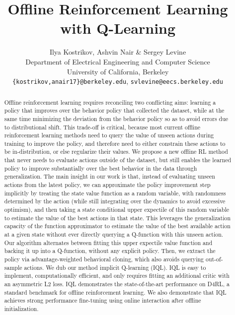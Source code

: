 \documentclass{article} %
\title{Offline Reinforcement Learning \\ with \Ournamepref Q-Learning}
\author{Ilya Kostrikov, Ashvin Nair \& Sergey Levine \\
Department of Electrical Engineering and Computer Science \\
University of California, Berkeley \\
\texttt{\{kostrikov,anair17\}@berkeley.edu}, \texttt{svlevine@eecs.berkeley.edu} 
}
\def\ourname{IQL\xspace}
\def\ournamepref{implicit\xspace}
\begin{document}
\maketitle

\begin{abstract}
Offline reinforcement learning requires reconciling two conflicting aims: learning a policy that improves over the behavior policy that collected the dataset, while at the same time minimizing the deviation from the behavior policy so as to avoid errors due to distributional shift. This trade-off is critical, because most current offline reinforcement learning methods need to query the value of unseen actions during training to improve the policy, and therefore need to either constrain these actions to be in-distribution, or else regularize their values. We propose a new offline RL method that never needs to evaluate actions outside of the dataset, but still enables the learned policy to improve substantially over the best behavior in the data through generalization.
The main insight in our work is that, instead of evaluating unseen actions from the latest policy, we can approximate the policy improvement step implicitly by treating the state value function as a random variable, with randomness determined by the action (while still integrating over the dynamics to avoid excessive optimism), and then taking a state conditional upper expectile of this random variable to estimate the value of the best actions in that state. This leverages the generalization capacity of the function approximator to estimate the value of the best available action at a given state without ever directly querying a Q-function with this unseen action.
Our algorithm alternates between fitting this upper expectile value function and backing it up into a Q-function, without any explicit policy. Then, we extract the policy via advantage-weighted behavioral cloning, which also avoids querying out-of-sample actions. We dub our method \ournamepref Q-learning (\ourname).  \ourname is easy to implement, computationally efficient, and only requires fitting an additional critic with an asymmetric L2 loss.
\ourname demonstrates the state-of-the-art performance on D4RL, a standard benchmark for offline reinforcement learning.
We also demonstrate that \ourname achieves strong performance fine-tuning using online interaction after offline initialization.
\end{abstract}
\end{document}
